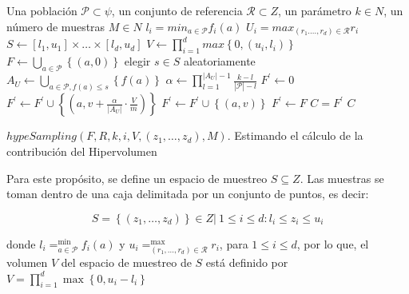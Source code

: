 \begin{algorithm}
\begin{algorithmic}[1]
	\REQUIRE Una poblaci\'on $\mathcal{P} \subset \psi$, un conjunto de referencia $\mathcal{R} \subset Z$, un par\'ametro $k \in N$, 
	un n\'umero de muestras $M \in N$		
			\STATE $l_i = min_{a \in \mathcal{P}}f_{i} \left(a\right)$
			\STATE $U_i = max_{\left(r_1.\ldots,r_d\right)\in \mathcal{R}}r_i$
		\ENDFOR
		\STATE $S \leftarrow  \left[l_1,u_1\right] \times \ldots \times \left[l_d,u_d\right]$
		\STATE $V \leftarrow \prod^{d}_{i=1} max\left\{ 0, \left(u_i,l_i\right)\right\}$
		\STATE $F \leftarrow \bigcup_{a \in \mathcal{P}}\left\{\left(a,0\right)\right\}$		
			\STATE elegir $s \in S$ aleatoriamente
					\STATE $A_U \leftarrow \bigcup_{a \in \mathcal{P}, f\left(a\right)\leq s}\left\{f\left(a\right)\right\}$
					\STATE $\alpha \leftarrow \prod^{\left|A_U\right|-1}_{l=1} \frac{k-l}{\left|\mathcal{P}\right|-l}$
					\STATE $F^{'}\leftarrow 0$
							\STATE $F^{'} \leftarrow F^{'} \cup \left\{\left(a, v + \frac{\alpha}{\left|A_U\right|}\cdot \frac{V}{m}\right)\right\}$						
						\ELSE
							\STATE $F^{'} \leftarrow F^{'} \cup \left\{\left(a, v \right)\right\}$						
						\ENDIF						
					\ENDFOR
						\STATE $F^{'} \leftarrow F$						
					\ENDIF
			\ENDIF 
		\ENDFOR
	\STATE $C = F^{'} $
	\RETURN $C$
\end{algorithmic}
\caption[$hypeSampling$]{$hypeSampling \left(F,R,k,i,V,\left(z_{1},\ldots,z_{d}\right),M\right)$. Estimando el c\'alculo de la contribuci\'on del Hipervolumen}
\label{alg:hvaprox} 
\end{algorithm}
  
  Para este prop\'osito, se define un espacio de muestreo $S \subseteq Z$. Las muestras se toman dentro de una caja 
  delimitada por un conjunto de puntos, es decir:
  
  \[S = \left\{\left(z_1, \ldots, z_d \right) \right\} \in Z | \ 1 \leq i \leq d: l_i \leq z_i \leq u_i\]
  
  donde $l_i = ^{\min}_{a\in \mathcal{P}} f_i\left(a \right)$ y $u_i = ^{\max}_{\left(r_1, \ldots, r_d\right)\in \mathcal{R}} r_i$, para
  $1 \leq i \leq d$, por lo que, el volumen $V$ del espacio de muestreo de $S$ est\'a definido por 
  $V = \prod^{d}_{i=1}{\max\left\{0, u_i - l_i \right\}}$ 
  
